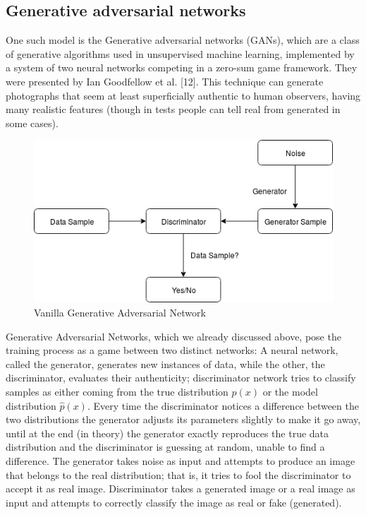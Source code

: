 \documentclass{vldb}
\begin{document}
\subsection{Generative adversarial networks}
One such model is the Generative adversarial networks (GANs), which are a class of generative algorithms used
in unsupervised machine learning, implemented by a system of two neural networks
competing in a zero-sum game framework. They were presented by Ian Goodfellow
et al. [12]. This technique can generate photographs that seem at least superficially
authentic to human observers, having many realistic features (though in tests people
can tell real from generated in some cases).
\label{sec:generative_adversarial_networks}
\begin{figure}
\includegraphics[width=\linewidth]{../Final_Report/images/vanillaGAN.png}
\caption{Vanilla Generative Adversarial Network}
\label{fig:gans}
\end{figure}
Generative Adversarial Networks, which we already discussed above, pose the training process as a game between two distinct networks: A neural network, called the generator, generates new instances of data, while the other, the discriminator, evaluates their authenticity; discriminator network tries to classify samples as either coming from the true distribution $p(x)$ or the model distribution $\hat{p}(x)$. Every time the discriminator notices a difference between the two distributions the generator adjusts its parameters slightly to make it go away, until at the end (in theory) the generator exactly reproduces the true data distribution and the discriminator is guessing at random, unable to find a difference.
The generator takes noise as input and attempts to produce an image that belongs to the real distribution; that is, it tries to fool the discriminator to accept it as real image. Discriminator takes a generated image or a real image as input and attempts to correctly classify the image as real or fake (generated).
\end{document}
